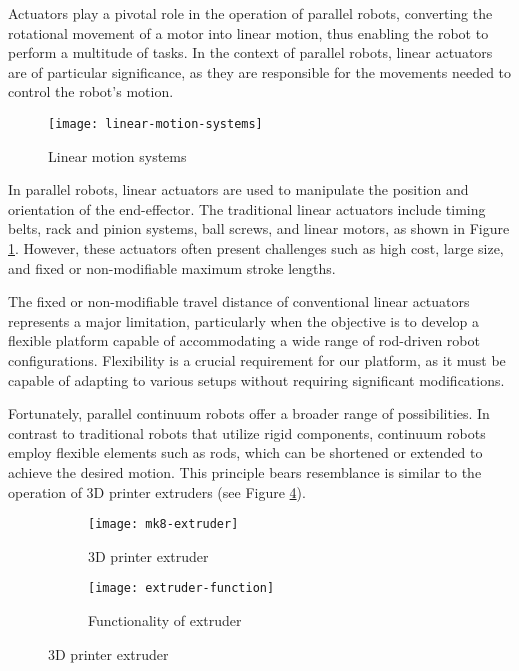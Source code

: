Actuators play a pivotal role in the operation of parallel robots, converting the rotational movement of a motor into linear motion, thus enabling the robot to perform a multitude of tasks. In the context of parallel robots, linear actuators are of particular significance, as they are responsible for the movements needed to control the robot's motion.

\begin{figure}[H]
    \centering
    \texttt{[image: linear-motion-systems]}
    \caption{Linear motion systems}
    \label{fig:linear-motion-systems}
\end{figure}

In parallel robots, linear actuators are used to manipulate the position and orientation of the end-effector. The traditional linear actuators include timing belts, rack and pinion systems, ball screws, and linear motors, as shown in Figure \ref{fig:linear-motion-systems}. However, these actuators often present challenges such as high cost, large size, and fixed or non-modifiable maximum stroke lengths.

The fixed or non-modifiable travel distance of conventional linear actuators represents a major limitation, particularly when the objective is to develop a flexible platform capable of accommodating a wide range of rod-driven robot configurations. Flexibility is a crucial requirement for our platform, as it must be capable of adapting to various setups without requiring significant modifications.

Fortunately, parallel continuum robots offer a broader range of possibilities. In contrast to traditional robots that utilize rigid components, continuum robots employ flexible elements such as rods, which can be shortened or extended to achieve the desired motion. This principle bears resemblance is similar to the operation of 3D printer extruders (see Figure \ref{fig:extruder}).

\begin{figure}[H]
    \centering
    \begin{subfigure}[b]{0.4\textwidth}
        \texttt{[image: mk8-extruder]}
        \caption{3D printer extruder}
        \label{fig:mk8-extruder}
    \end{subfigure}
    \begin{subfigure}[b]{0.4\textwidth}
        \texttt{[image: extruder-function]}
        \caption{Functionality of extruder}
        \label{fig:extruder-function}
    \end{subfigure}
    \caption{3D printer extruder}
    \label{fig:extruder}
\end{figure}

